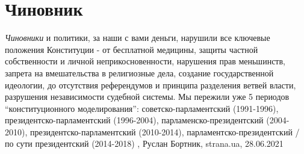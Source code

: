  
 
 
 
 
\chapter{Чиновник}
\label{sec:slova.chinovnik}

\emph{Чиновники} и политики, за наши с вами деньги, нарушили все ключевые положения
Конституции - от бесплатной медицины, защиты частной собственности и личной
неприкосновенности, нарушения прав меньшинств, запрета на вмешательства в
религиозные дела, создание государственной идеологии, до отсутствия
референдумов и принципа разделения ветвей власти, разрушения независимости
судебной системы.  Мы пережили уже 5 периодов \enquote{конституционного моделирования}:
советско-парламентский (1991-1996), президентско-парламентский (1996-2004),
парламенско-президентский (2004-2010), президентско-парламентский (2010-2014),
парламентско-президентский / по сути президентский (2014-2018)
, 
Руслан Бортник, strana.ua, 28.06.2021
